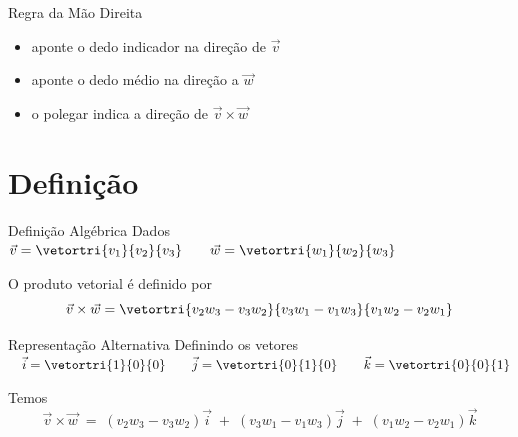 \documentclass[fleqn,aspectratio=169,12pt]{beamer}
\begin{document}
\begin{frame}{Regra da Mão Direita}

  \bigskip
  \begin{itemize}[<+->]
      \item aponte o dedo indicador na direção de $\vec{v}$
      \item aponte o dedo médio na direção a $\vec{w}$
      \item o polegar indica a direção de $\vec{v}\times\vec{w}$
  \end{itemize}

  \bigskip
  \onslide<+->{
  \[
    \vec{v}\times\vec{w} \;=\; -\left(\vec{w}\times\vec{v}\right)
  \]}
\end{frame}

\section{Definição}

\begin{frame}{Definição Algébrica}
  Dados \quad
  \(
    \vec{v} = \vetortri{v_1}{v_2}{v_3}
    \qquad
    \vec{w} = \vetortri{w_1}{w_2}{w_3}
  \)

  \pause
  \bigskip
  O produto vetorial é definido por
  \[
    \vec{v}\times\vec{w}
    = \vetortri{v_2w_3-v_3w_2}{v_3w_1-v_1w_3}{v_1w_2-v_2w_1}
  \]
\end{frame}

\begin{frame}{Representação Alternativa}
  Definindo os vetores
  \(
    \quad
    \vec{i} = \vetortri{1}{0}{0}
    \qquad
    \vec{j} = \vetortri{0}{1}{0}
    \qquad
    \vec{k} = \vetortri{0}{0}{1}
  \)

  \pause
  \bigskip
  Temos
   \[
    \vec{v}\times\vec{w}
    \;=\; \left( v_2 w_3 - v_3 w_2 \right) \vec{i}
    \;+\; \left( v_3 w_1 - v_1 w_3 \right) \vec{j}
    \;+\; \left( v_1 w_2 - v_2 w_1 \right) \vec{k}
  \]
\end{frame}
\end{document}
